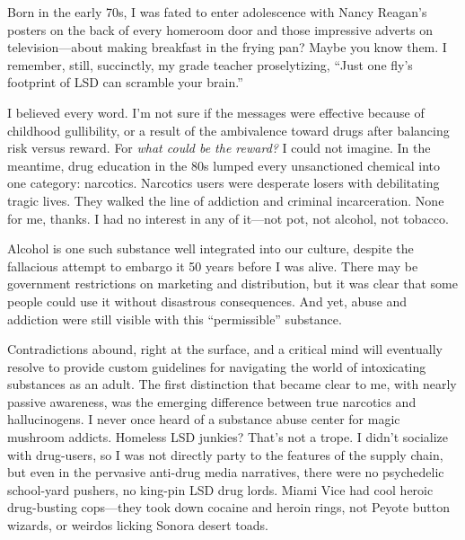 \documentclass{UIdahoMastersThesis}
\begin{document}

Born in the early 70s, I was fated to enter adolescence with Nancy Reagan's posters on the back of every homeroom door and those impressive adverts on television---about making breakfast in the frying pan? Maybe you know them. I remember, still, succinctly, my  grade teacher proselytizing, \enquote{Just one fly's footprint of LSD can scramble your brain.}

I believed every word. I'm not sure if the messages were effective because of childhood gullibility, or a result of the ambivalence toward drugs after balancing risk versus reward. For \emph{what could be the reward?} I could not imagine. In the meantime, drug education in the 80s lumped every unsanctioned chemical into one category: narcotics. Narcotics users were desperate losers with debilitating tragic lives. They walked the line of addiction and criminal incarceration. None for me, thanks. I had no interest in any of it---not pot, not alcohol, not tobacco.

Alcohol is one such substance well integrated into our culture, despite the fallacious attempt to embargo it 50 years before I was alive. There may be government restrictions on marketing and distribution, but it was clear that some people could use it without disastrous consequences. And yet, abuse and addiction were still visible with this ``permissible'' substance.

Contradictions abound, right at the surface, and a critical mind will eventually resolve to provide custom guidelines for navigating the world of intoxicating substances as an adult. The first distinction that became clear to me, with nearly passive awareness, was the emerging difference between true narcotics and hallucinogens. I never once heard of a substance abuse center for magic mushroom addicts. Homeless LSD junkies? That's not a trope. I didn't socialize with drug-users, so I was not directly party to the features of the supply chain, but even in the pervasive anti-drug media narratives, there were no psychedelic school-yard pushers, no king-pin LSD drug lords. Miami Vice had cool heroic drug-busting cops---they took down cocaine and heroin rings, not Peyote button wizards, or weirdos licking Sonora desert toads.
\end{document}
